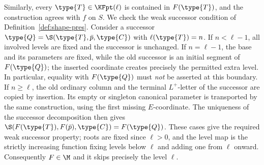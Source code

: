 Similarly, every $\type{T}\in\KFpt(\ell)$ is contained
		in $F(\type{T})$, and the construction agrees with $f$ on $S$.
		We check the weak successor condition of
		Definition~\ref{def:shape-pres}.
		Consider a successor
		$\type{Q}=\S(\type{T},\bar p,\type{C})$
		with $\ell(\type{T})=n$.
		If $n<\ell-1$, all involved levels are fixed and the successor
		is unchanged.
		If $n=\ell-1$, the base and its parameters are fixed, while the
		old successor is an initial segment of $F(\type{Q})$;
		the inserted coordinate creates precisely the permitted extra
		level. In particular, equality with $F(\type{Q})$ must
		\emph{not} be asserted at this boundary.
		If $n\geq\ell$, the old ordinary column and the terminal
		$L^+$-letter of the successor are copied by insertion.
		Its empty or singleton canonical parameter is transported
		by the same construction, using the first missing $E$-coordinate.
		The uniqueness of the successor decomposition then gives
		$\S(F(\type{T}),F(\bar p),\type{C})=F(\type{Q})$.
		These cases give the required weak successor property; roots
		are fixed since $\ell>0$, and the level map is the strictly
		increasing function fixing levels below $\ell$ and adding one
		from $\ell$ onward.
		Consequently $F\in\M$ and it skips precisely the level $\ell$.
